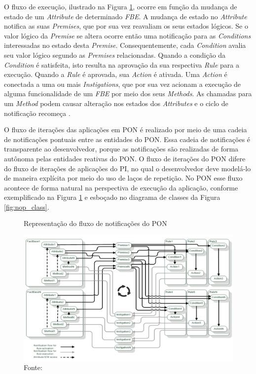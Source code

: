 O fluxo de execução, ilustrado na Figura \ref{fig:nop_chain}, ocorre em função
da mudança de estado de um \textit{Attribute} de determinado \textit{FBE}. A
mudança de estado no \textit{Attribute} notifica as suas \textit{Premises}, que
por sua vez reavaliam os seus estados lógicos. Se o valor lógico da
\textit{Premise} se altera ocorre então uma notificação para as
\textit{Conditions} interessadas no estado desta \textit{Premise}.
Consequentemente, cada \textit{Condition} avalia seu valor lógico segundo as
\textit{Premises} relacionadas. Quando a condição da \textit{Condition} é
satisfeita, isto resulta na aprovação da sua respectiva \textit{Rule} para a
execução. Quando a \textit{Rule} é aprovada, sua \textit{Action} é ativada. Uma
\textit{Action} é conectada a uma ou mais \textit{Instigations}, que por sua vez
acionam a execução de alguma funcionalidade de um \textit{FBE} por meio dos seus
\textit{Methods}. As chamadas para um \textit{Method} podem causar alteração nos
estados dos \textit{Attributes} e o ciclo de notificação recomeça
\cite{msc_Banaszewski_2009}.

O fluxo de iterações das aplicações em PON é realizado por meio de uma cadeia de
notificações pontuais entre as entidades do PON. Essa cadeia de notificações é
transparente ao desenvolvedor, porque as notificações são realizadas de forma
autônoma pelas entidades reativas do PON. O fluxo de iterações do PON difere do
fluxo de iterações de aplicações do PI, no qual o desenvolvedor deve modelá-lo
de maneira explícita por meio do uso de laços de repetição. No PON esse fluxo
acontece de forma natural na perspectiva de execução da aplicação, conforme
exemplificado na Figura \ref{fig:nop_chain} e esboçado no diagrama de classes da
Figura \ref{fig:nop_class}.

\begin{figure}[!htb]
  \centering
  \caption{Representação do fluxo de notificações do PON}
  \includegraphics[width=\textwidth]{../figures/notificacoes_linhares.png}
  \smallskip
  \caption*{Fonte: }
  \label{fig:nop_chain}
\end{figure}

